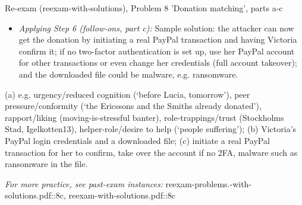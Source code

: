 \documentclass[12pt, a4paper]{article}
\begin{document}
\begin{practicebox}{Re-exam (reexam-with-solutions), Problem 8 'Donation matching', parts a-c}
\begin{itemize}
    \emph{Trap:} the 200 SEK was never shown to be paid --- do not claim the attacker got the donation money yet; only credentials and the download are proven.
    \item \textit{Applying Step 6 (follow-ons, part c):} Sample solution: the attacker can now get the donation by initiating a real PayPal transaction and having Victoria confirm it; if no two-factor authentication is set up, use her PayPal account for other transactions or even change her credentials (full account takeover); and the downloaded file could be malware, e.g. ransomware.
\end{itemize}

\begin{answerbox}
(a) e.g. urgency/reduced cognition (`before Lucia, tomorrow'), peer pressure/conformity (`the Ericssons and the Smiths already donated'), rapport/liking (moving-is-stressful banter), role-trappings/trust (Stockholms Stad, Igelkotten13), helper-role/desire to help (`people suffering'); (b) Victoria's PayPal login credentials and a downloaded file; (c) initiate a real PayPal transaction for her to confirm, take over the account if no 2FA, malware such as ransomware in the file.
\end{answerbox}
\end{practicebox}

\textit{For more practice, see past-exam instances:} reexam-problems.-with-solutions.pdf::8c, reexam-with-solutions.pdf::8c
\end{document}
